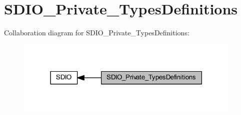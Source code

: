 \hypertarget{group___s_d_i_o___private___types_definitions}{}\section{S\+D\+I\+O\+\_\+\+Private\+\_\+\+Types\+Definitions}
\label{group___s_d_i_o___private___types_definitions}
Collaboration diagram for S\+D\+I\+O\+\_\+\+Private\+\_\+\+Types\+Definitions\+:
\nopagebreak
\begin{figure}[H]
\begin{center}
\leavevmode
\includegraphics[width=307pt]{group___s_d_i_o___private___types_definitions}
\end{center}
\end{figure}

